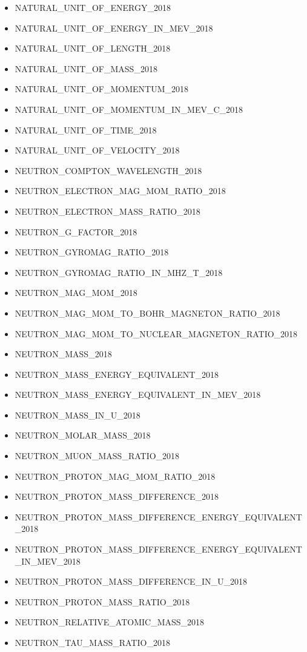 \begin{itemize}
\item NATURAL\_UNIT\_OF\_ENERGY\_2018
\item NATURAL\_UNIT\_OF\_ENERGY\_IN\_MEV\_2018
\item NATURAL\_UNIT\_OF\_LENGTH\_2018
\item NATURAL\_UNIT\_OF\_MASS\_2018
\item NATURAL\_UNIT\_OF\_MOMENTUM\_2018
\item NATURAL\_UNIT\_OF\_MOMENTUM\_IN\_MEV\_C\_2018
\item NATURAL\_UNIT\_OF\_TIME\_2018
\item NATURAL\_UNIT\_OF\_VELOCITY\_2018
\item NEUTRON\_COMPTON\_WAVELENGTH\_2018
\item NEUTRON\_ELECTRON\_MAG\_MOM\_RATIO\_2018
\item NEUTRON\_ELECTRON\_MASS\_RATIO\_2018
\item NEUTRON\_G\_FACTOR\_2018
\item NEUTRON\_GYROMAG\_RATIO\_2018
\item NEUTRON\_GYROMAG\_RATIO\_IN\_MHZ\_T\_2018
\item NEUTRON\_MAG\_MOM\_2018
\item NEUTRON\_MAG\_MOM\_TO\_BOHR\_MAGNETON\_RATIO\_2018
\item NEUTRON\_MAG\_MOM\_TO\_NUCLEAR\_MAGNETON\_RATIO\_2018
\item NEUTRON\_MASS\_2018
\item NEUTRON\_MASS\_ENERGY\_EQUIVALENT\_2018
\item NEUTRON\_MASS\_ENERGY\_EQUIVALENT\_IN\_MEV\_2018
\item NEUTRON\_MASS\_IN\_U\_2018
\item NEUTRON\_MOLAR\_MASS\_2018
\item NEUTRON\_MUON\_MASS\_RATIO\_2018
\item NEUTRON\_PROTON\_MAG\_MOM\_RATIO\_2018
\item NEUTRON\_PROTON\_MASS\_DIFFERENCE\_2018
\item NEUTRON\_PROTON\_MASS\_DIFFERENCE\_ENERGY\_EQUIVALENT\_2018
\item NEUTRON\_PROTON\_MASS\_DIFFERENCE\_ENERGY\_EQUIVALENT\_IN\_MEV\_2018
\item NEUTRON\_PROTON\_MASS\_DIFFERENCE\_IN\_U\_2018
\item NEUTRON\_PROTON\_MASS\_RATIO\_2018
\item NEUTRON\_RELATIVE\_ATOMIC\_MASS\_2018
\item NEUTRON\_TAU\_MASS\_RATIO\_2018

\end{itemize}
